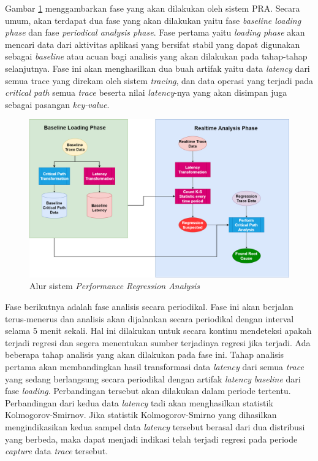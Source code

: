 Gambar \ref{alur-pra} menggambarkan fase yang akan dilakukan oleh sistem PRA. Secara umum, akan terdapat dua fase yang akan dilakukan yaitu fase \textit{baseline loading phase} dan fase \textit{periodical analysis phase}. Fase pertama yaitu \textit{loading phase} akan mencari data dari aktivitas aplikasi yang bersifat stabil yang dapat digunakan sebagai \textit{baseline} atau acuan bagi analisis yang akan dilakukan pada tahap-tahap selanjutnya. Fase ini akan menghasilkan dua buah artifak yaitu data \textit{latency} dari semua trace yang direkam oleh sistem \textit{tracing}, dan data operasi yang terjadi pada \textit{critical path} semua \textit{trace} beserta nilai \textit{latency}-nya yang akan disimpan juga sebagai pasangan \textit{key-value}. 
\begin{figure}[!htb]
	\centering
	\includegraphics[width=1\textwidth,scale=5]{resources/ch3/alur_v2.png}
	\caption{Alur sistem \textit{Performance Regression Analysis}}
	\label{alur-pra}
\end{figure}

Fase berikutnya adalah fase analisis secara periodikal. Fase ini akan berjalan terus-menerus dan analisis akan dijalankan secara periodikal dengan interval selama 5 menit sekali. Hal ini dilakukan untuk secara kontinu mendeteksi apakah terjadi regresi dan segera menentukan sumber terjadinya regresi jika terjadi. Ada beberapa tahap analisis yang akan dilakukan pada fase ini.  Tahap analisis pertama akan membandingkan hasil transformasi data \textit{latency} dari semua \textit{trace} yang sedang berlangsung secara periodikal dengan artifak \textit{latency} \textit{baseline} dari fase \textit{loading}. Perbandingan tersebut akan dilakukan dalam periode tertentu. Perbandingan dari kedua data \textit{latency} tadi akan menghasilkan statistik Kolmogorov-Smirnov. Jika statistik Kolmogorov-Smirno yang dihasilkan mengindikasikan kedua sampel data \textit{latency} tersebut berasal dari dua distribusi yang berbeda, maka dapat menjadi indikasi telah terjadi regresi pada periode \textit{capture} data \textit{trace} tersebut. 

